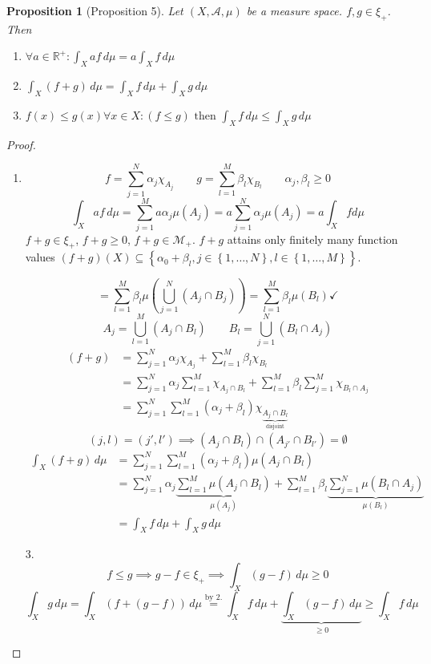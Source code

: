 \documentclass{article}
\newtheorem{proposition}{Proposition}  \numberwithin{proposition}{section}
\newcommand{\set}[1]{\left\{#1\right\}}
\begin{document}
\begin{proposition}[Proposition 5]
  Let $(X, \mathcal A, \mu)$ be a measure space.
  $f,g \in \xi_+$. Then
  \begin{enumerate}
    \item $\forall a \in \mathbb R^+: \int_X a f \, d\mu = a \int_X f \, d\mu$
    \item $\int_X (f + g) \, d\mu = \int_X f \, d\mu + \int_X g \, d\mu$
    \item $f(x) \leq g(x) \forall x \in X: (f \leq g) \text{ then } \int_X f \, d\mu \leq \int_X g \, d\mu$
  \end{enumerate}
\end{proposition}
\begin{proof}
  \begin{enumerate}
    \item \[ f = \sum_{j=1}^N \alpha_j \chi_{A_j} \qquad g = \sum_{l=1}^M \beta_l \chi_{B_l} \qquad \alpha_j, \beta_l \geq 0 \]
    \[ \int_X af \,d\mu = \sum_{j=1}^M a \alpha_j \mu(A_j) = a \sum_{j=1}^N \alpha_j \mu(A_j) = a \int_X fd\mu \]
    $f + g \in \xi_+$, $f + g \geq 0$, $f + g \in \mathcal M_+$.
    $f + g$ attains only finitely many function values $(f+g)(X) \subseteq \set{\alpha_0 + \beta_l, j \in \set{1,\ldots,N}, l\in\set{1,\ldots,M}}$.

    \[ = \sum_{l=1}^M \beta_l \mu(\bigcup_{j=1}^N (A_j \cap B_j)) = \sum_{l=1}^M \beta_l \mu(B_l) \checkmark \]
    \[ A_j = \bigcup_{l=1}^M (A_j \cap B_l) \qquad B_l = \bigcup_{j=1}^N (B_l \cap A_j) \]
    \begin{align*}
      (f+g)
        &= \sum_{j=1}^N \alpha_j \chi_{A_j} + \sum_{l=1}^M \beta_l \chi_{B_l} \\
        &= \sum_{j=1}^N \alpha_j \sum_{l=1}^M \chi_{A_j \cap B_l} + \sum_{l=1}^M \beta_l \sum_{j=1}^M \chi_{B_l \cap A_j} \\
        &= \sum_{j=1}^N \sum_{l=1}^M (\alpha_j + \beta_l) \chi_{\underbrace{A_j \cap B_l}_{\text{disjoint}}}
    \end{align*}
    \[
      (j,l) = (j', l') \implies (A_j \cap B_l) \cap (A_{j'} \cap B_{l'}) = \emptyset
    \]
    \begin{align*}
      \int_X (f+g) \, d\mu
        &= \sum_{j=1}^N \sum_{l=1}^M (\alpha_j + \beta_l) \mu(A_j \cap B_l) \\
        &= \sum_{j=1}^N \alpha_j \underbrace{\sum_{l=1}^M \mu(A_j \cap B_l)}_{\mu(A_j)} + \sum_{l=1}^M \beta_l \underbrace{\sum_{j=1}^N \mu(B_l \cap A_j)}_{\mu(B_l)} \\
        &= \int_X f \, d\mu + \int_X g \, d\mu
    \end{align*}
    \item[3.] \[
      f \leq g \implies g-f \in \xi_+ \implies \int_X (g-f) \, d\mu \geq 0
    \] \[
      \int_X g \, d\mu = \int_X (f + (g - f)) \, d\mu \stackrel{\text{by 2.}}{=} \int_X f \, d\mu + \underbrace{\int_X (g - f) \, d\mu}_{\geq 0} \geq \int_X f \, d\mu
    \]
  \end{enumerate}
\end{proof}
\end{document}

